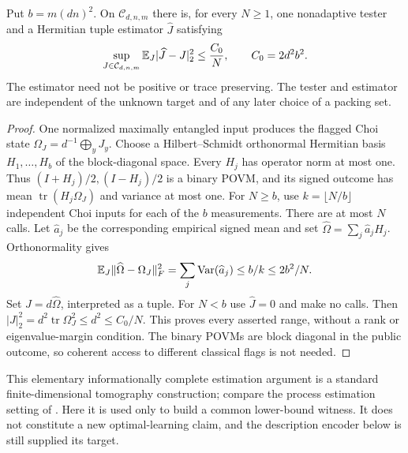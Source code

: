 \begin{lemma}\label{lem:tomography71}
Put $b=m(dn)^2$. On $\mathcal C_{d,n,m}$ there is, for every $N\ge1$,
one nonadaptive tester and a Hermitian tuple estimator $\widehat J$
satisfying
\begin{equation}\label{eq:tomography71}
 \sup_{J\in\mathcal C_{d,n,m}}
      \mathbb E_J |\widehat J-J|_2^2\le \frac{C_0}{N},
                  \qquad C_0=2d^2b^2.
\end{equation}
The estimator need not be positive or trace preserving. The tester
and estimator are independent of the unknown target and of any later
choice of a packing set.
\end{lemma}
\begin{proof}
One normalized maximally entangled input produces the flagged Choi
state $\Omega_J=d^{-1}\bigoplus_y J_y$. Choose a Hilbert--Schmidt
orthonormal Hermitian basis $H_1,\ldots,H_b$ of the block-diagonal
space. Every $H_j$ has operator norm at most one. Thus
$(I+H_j)/2,(I-H_j)/2$ is a binary POVM, and its signed outcome has
mean $\operatorname{tr}(H_j\Omega_J)$ and variance at most one.
For $N\ge b$, use $k=\lfloor N/b\rfloor$ independent Choi inputs
for each of the $b$ measurements. There are at most $N$ calls. Let
$\widehat a_j$ be the corresponding empirical signed mean and set
$\widehat\Omega=\sum_j\widehat a_jH_j$. Orthonormality gives
\[
 \mathbb E_J\|\widehat\Omega-\Omega_J\|_F^2
   =\sum_j\operatorname{Var}(\widehat a_j)
   \le b/k\le2b^2/N.
\]
Set $\widehat J=d\widehat\Omega$, interpreted as a tuple. For $N<b$
use $\widehat J=0$ and make no calls. Then
$|J|_2^2=d^2\operatorname{tr}\Omega_J^2\le d^2\le C_0/N$.
This proves every asserted range, without a rank or eigenvalue-margin
condition. The binary POVMs are block diagonal in the public outcome,
so coherent access to different classical flags is not needed.
\end{proof}
This elementary informationally complete estimation argument is a
standard finite-dimensional tomography construction; compare the process
estimation setting of \cite{PLS66}. Here it is used only to build a common
lower-bound witness. It does not constitute a new optimal-learning
claim, and the description encoder below is still supplied its target.

